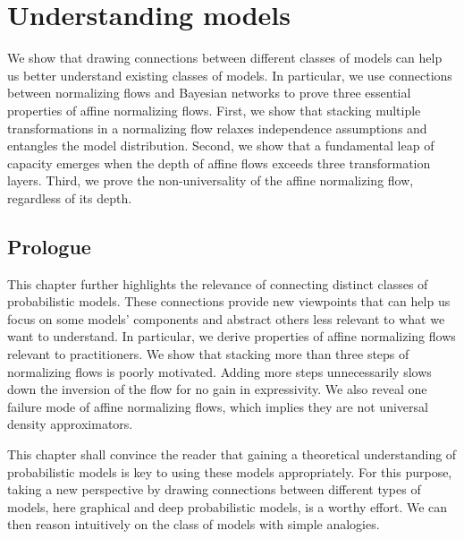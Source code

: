 \chapter{Understanding models}\label{ch:04}

\begin{chapter_outline}

  We show that drawing connections between different classes of models can help us better understand existing classes of models.
  In particular, we use connections between normalizing flows and Bayesian networks to prove three essential properties of affine normalizing flows.
  First, we show that stacking multiple transformations in a normalizing flow relaxes independence assumptions and entangles the model distribution.
  Second, we show that a fundamental leap of capacity emerges when the depth of affine flows exceeds three transformation layers.
  Third, we prove the non-universality of the affine normalizing flow, regardless of its depth.
\end{chapter_outline}

\section{Prologue}
This chapter further highlights the relevance of connecting distinct classes of probabilistic models. These connections provide new viewpoints that can help us focus on some models' components and abstract others less relevant to what we want to understand. In particular, we derive properties of affine normalizing flows relevant to practitioners. We show that stacking more than three steps of normalizing flows is poorly motivated. Adding more steps unnecessarily slows down the inversion of the flow for no gain in expressivity. We also reveal one failure mode of affine normalizing flows, which implies they are not universal density approximators.

This chapter shall convince the reader that gaining a theoretical understanding of probabilistic models is key to using these models appropriately. For this purpose, taking a new perspective by drawing connections between different types of models, here graphical and deep probabilistic models, is a worthy effort. We can then reason intuitively on the class of models with simple analogies.

